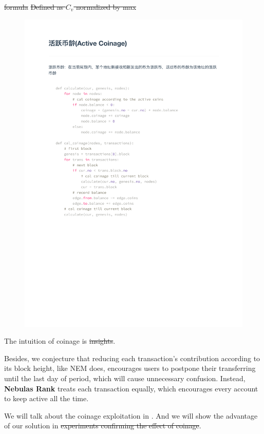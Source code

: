 \st{formula} \st{Defined as $C_v$ normalized by max}

\begin{figure}
\includegraphics{coinage.pdf}
\end{figure}


The intuition of coinage is \st{insights}.

Besides, we conjecture that reducing each transaction's contribution according to its block height, like NEM does\cite{nem}, encourages users to postpone their transferring until the last day of period, which will cause unnecessary confusion. Instead, \textbf{Nebulas Rank} treats each transaction equally, which encourages every account to keep active all the time.

We will talk about the coinage exploitation in . And we will show the advantage of our solution in  \st{experiments confirming the effect of coinage}.


